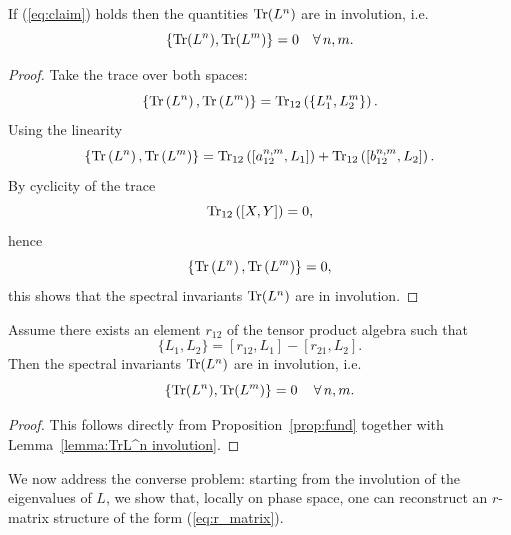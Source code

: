 \begin{lemma} \label{lemma:TrL^n involution}
    If (\ref{eq:claim}) holds then the quantities $\Tr(L^n)$ are in involution, i.e.
    \begin{equation}
        \{\Tr(L^n), \Tr(L^m)\} = 0 \quad \forall \, n, m.
    \end{equation}
\end{lemma}
\begin{proof}
    Take the trace over both spaces:
    \begin{equation}
        \{\Tr\left(L^n\right) , \Tr\left(L^m\right)\}
        = \Tr_{12}\left(\left\{L_1^n , L_2^m\right\}\right).
    \end{equation}
    Using the linearity 
    \begin{equation}
        \{\Tr\left(L^n\right) , \Tr\left(L^m\right)\} 
        = \Tr_{12}\left(\left[a_{12}^{n,m} , L_1\right]\right) + \Tr_{12}\left(\left[b_{12}^{n,m} , L_2\right]\right).
    \end{equation}
    By cyclicity of the trace
    \begin{equation}
        \Tr_{12}\left(\left[X , Y\right]\right) = 0,
    \end{equation}
    hence
    \begin{equation}
        \{\Tr\left(L^n\right) , \Tr\left(L^m\right)\} = 0,
    \end{equation}
    this shows that the spectral invariants $\Tr(L^n)$ are in involution.
\end{proof}


\begin{corollary} \label{cor:importante}
    Assume there exists an element $r_{12}$ of the tensor product algebra such that
    \begin{equation}
        \{L_1, L_2\} = [r_{12}, L_1] - [r_{21}, L_2].
    \end{equation}
    Then the spectral invariants $\Tr (L^n)$ are in involution, i.e.
    \begin{equation}
        \{\Tr(L^n), \Tr(L^m)\} = 0 \quad \, \forall \, n,m.
    \end{equation}
\end{corollary}

\begin{proof}
    This follows directly from Proposition~\ref{prop:fund} together with Lemma~\ref{lemma:TrL^n involution}.
\end{proof}

We now address the converse problem: starting from the involution of the eigenvalues of $L$, we show that, locally on phase space, one can reconstruct an $r$-matrix structure of the form (\ref{eq:r_matrix}).


